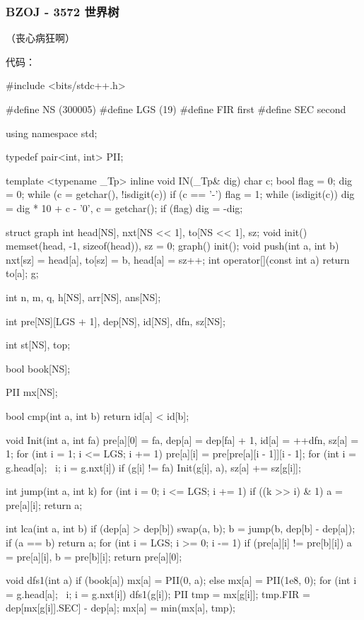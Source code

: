 \subsubsection{BZOJ - 3572 世界树}

（丧心病狂啊）

代码：

\begin{cppcode}
#include <bits/stdc++.h>

#define NS (300005)
#define LGS (19)
#define FIR first
#define SEC second

using namespace std;

typedef pair<int, int> PII;

template <typename _Tp>
inline void IN(_Tp& dig) {
  char c;
  bool flag = 0;
  dig = 0;
  while (c = getchar(), !isdigit(c))
    if (c == '-') flag = 1;
  while (isdigit(c)) dig = dig * 10 + c - '0', c = getchar();
  if (flag) dig = -dig;
}

struct graph {
  int head[NS], nxt[NS << 1], to[NS << 1], sz;
  void init() { memset(head, -1, sizeof(head)), sz = 0; }
  graph() { init(); }
  void push(int a, int b) { nxt[sz] = head[a], to[sz] = b, head[a] = sz++; }
  int operator[](const int a) { return to[a]; }
} g;

int n, m, q, h[NS], arr[NS], ans[NS];

int pre[NS][LGS + 1], dep[NS], id[NS], dfn, sz[NS];

int st[NS], top;

bool book[NS];

PII mx[NS];

bool cmp(int a, int b) { return id[a] < id[b]; }

void Init(int a, int fa) {
  pre[a][0] = fa, dep[a] = dep[fa] + 1, id[a] = ++dfn, sz[a] = 1;
  for (int i = 1; i <= LGS; i += 1) pre[a][i] = pre[pre[a][i - 1]][i - 1];
  for (int i = g.head[a]; ~i; i = g.nxt[i])
    if (g[i] != fa) Init(g[i], a), sz[a] += sz[g[i]];
}

int jump(int a, int k) {
  for (int i = 0; i <= LGS; i += 1)
    if ((k >> i) & 1) a = pre[a][i];
  return a;
}

int lca(int a, int b) {
  if (dep[a] > dep[b]) swap(a, b);
  b = jump(b, dep[b] - dep[a]);
  if (a == b) return a;
  for (int i = LGS; i >= 0; i -= 1)
    if (pre[a][i] != pre[b][i]) a = pre[a][i], b = pre[b][i];
  return pre[a][0];
}

void dfs1(int a) {
  if (book[a])
    mx[a] = PII(0, a);
  else
    mx[a] = PII(1e8, 0);
  for (int i = g.head[a]; ~i; i = g.nxt[i]) {
    dfs1(g[i]);
    PII tmp = mx[g[i]];
    tmp.FIR = dep[mx[g[i]].SEC] - dep[a];
    mx[a] = min(mx[a], tmp);
  }
}


\end{cppcode}
